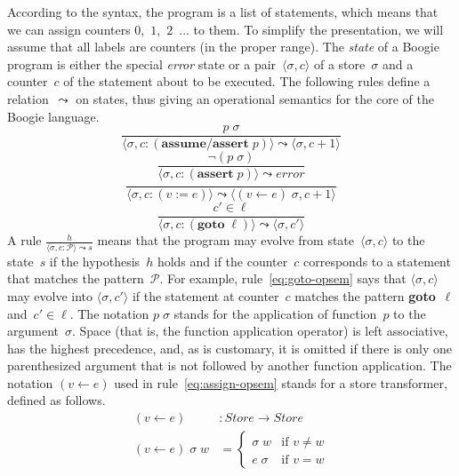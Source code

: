 \documentclass[a4paper]{article}
\theoremstyle{slanted}
\theoremstyle{definition}
\theoremstyle{remark}
\begin{document}
According to the syntax, the program is a list of statements,
which means that we can assign counters $0$,~$1$,~$2$~$\ldots$
to them. To simplify the presentation, we will assume that all
labels are counters (in the proper range). The \emph{state} of
a Boogie program is either the special \textit{error} state
or a pair~$\langle\sigma,c\rangle$ of a store~$\sigma$ and a
counter~$c$ of the statement about to be executed. The following
rules define a relation~$\leadsto$ on states, thus giving an
operational semantics for the core of the Boogie language.
\begin{equation}
\frac
  {p\;\sigma}
  {\langle\sigma,c:(\mathbf{assume}/\mathbf{assert}\;p)\rangle \leadsto 
    \langle\sigma,c+1\rangle}
  \label{eq:assume-assert-ok-opsem}
\end{equation}
\begin{equation}
\frac
  {\lnot(p\;\sigma)}
  {\langle\sigma,c:(\mathbf{assert}\;p)\rangle \leadsto \mathit{error}}
  \label{eq:assert-nok-opsem}
\end{equation}
\begin{equation}
\frac
  {}
  {\langle\sigma,c:(v\mathtt{:=}e)\rangle \leadsto 
    \langle(v\gets e)\;\sigma,c+1\rangle}
  \label{eq:assign-opsem}
\end{equation}
\begin{equation}
\frac
  {c' \in \ell}
  {\langle\sigma,c:(\mathbf{goto}\;\ell)\rangle \leadsto 
    \langle\sigma,c'\rangle}
  \label{eq:goto-opsem}
\end{equation}
A rule $\frac{h}{\langle\sigma,c:\mathscr{P}\rangle\leadsto
s}$ means that the program may evolve from
state~$\langle\sigma,c\rangle$ to the state~$s$ if the
hypothesis~$h$ holds and if the counter~$c$ corresponds to a
statement that matches the pattern~$\mathscr{P}$. For example,
rule~\eqref{eq:goto-opsem} says that $\langle\sigma,c\rangle$
may evolve into $\langle\sigma,c'\rangle$ if the statement
at counter~$c$ matches the pattern \textbf{goto}~$\ell$
and~$c'\in\ell$. The notation $p\;\sigma$ stands for the
application of function~$p$ to the argument~$\sigma$. Space (that
is, the function application operator) is left associative, has
the highest precedence, and, as is customary, it is omitted if
there is only one parenthesized argument that is not followed by
another function application. The notation $(v \gets e)$ used
in rule~\eqref{eq:assign-opsem} stands for a store transformer,
defined as follows.
\begin{align}
(v \gets e) &: \mathit{Store}\to\mathit{Store} \\
(v \gets e)\;\sigma\;w &=
  \begin{cases}
  \sigma\;w& \text{if $v\ne w$}\\
  e\;\sigma& \text{if $v=w$}
  \end{cases}
\end{align}
\end{document}
